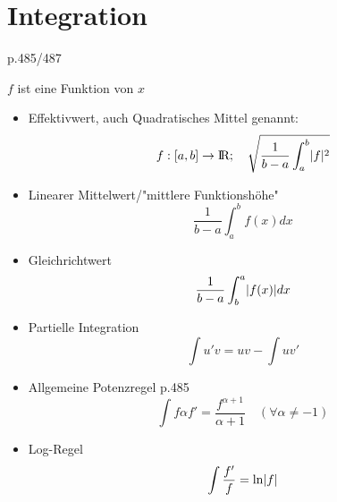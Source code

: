 \section{Integration}
	{\color{red}p.485/487}

$f$ ist eine Funktion von $x$
\begin{itemize}
	\item Effektivwert,
		auch Quadratisches Mittel genannt: 
	\[
		f:[a,b]\rightarrow\text{\rmfamily I\!R}; \quad \sqrt{\frac{1}{b-a}\int^b_a\lvert f\rvert^2}
	\]
	\item Linearer Mittelwert/"mittlere Funktionshöhe" 
	\[
		\frac{1}{b-a}\int^b_af(x)dx
	\] 
	\item Gleichrichtwert
	\[
		\frac{1}{b-a}\int^a_b\lvert f(x)\rvert dx
	\]
	\item Partielle Integration
	\[
		\int u'v = uv-\int uv'
	\]
	\item Allgemeine Potenzregel {\color{red}p.485}
	\[
		\int f\alpha f' = \frac{f^{\alpha+1}}{\alpha+1} \quad(\forall \alpha\neq-1)
	\]
	\item Log-Regel
	\[
		\int\frac{f'}{f}=\ln\lvert f\rvert
	\]
\end{itemize}	